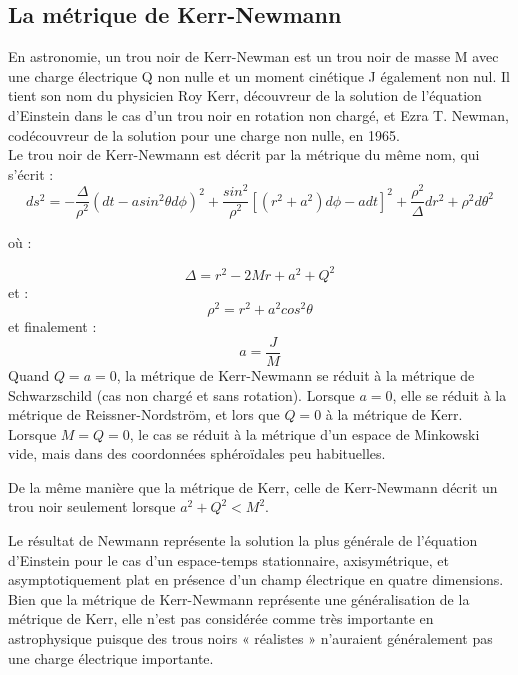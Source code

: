 \subsection{La métrique de Kerr-Newmann}
En astronomie, un trou noir de Kerr-Newman est un trou noir de masse M avec une charge électrique Q non nulle et un moment cinétique J également non nul. Il tient son nom du physicien Roy Kerr, découvreur de la solution de l'équation d'Einstein dans le cas d'un trou noir en rotation non chargé, et Ezra T. Newman, codécouvreur de la solution pour une charge non nulle, en 1965.\\
Le trou noir de Kerr-Newmann est décrit par la métrique du même nom, qui s'écrit :
\begin{equation}
ds^{2}=-\dfrac{\Delta}{\rho^{2}}(dt-asin^{2}\theta d\phi)^{2}+\dfrac{sin^{2}}{\rho^{2}}[(r^{2}+a^{2})d\phi-adt]^{2}+\dfrac{\rho^{2}}{\Delta}dr^{2}+\rho^{2}d\theta^{2}
\end{equation}

où :

$$\Delta=r^{2}-2Mr+a^{2}+Q^{2}$$
et :
$$\rho^{2}=r^{2}+a^{2}cos^{2}\theta$$ 
et finalement :
$$a=\dfrac{J}{M}$$
Quand $Q=a=0$, la métrique de Kerr-Newmann se réduit à la métrique de Schwarzschild (cas non chargé et sans rotation). Lorsque $a=0$, elle se réduit à la métrique de Reissner-Nordström, et lors que $ Q=0$ à la métrique de Kerr. Lorsque $ M=Q=0$, le cas se réduit à la métrique d'un espace de Minkowski vide, mais dans des coordonnées sphéroïdales peu habituelles.

De la même manière que la métrique de Kerr, celle de Kerr-Newmann décrit un trou noir seulement lorsque $a^{2}+Q^{2}< M^{2}$.	
	
Le résultat de Newmann représente la solution la plus générale de l'équation d'Einstein pour le cas d'un espace-temps stationnaire, axisymétrique, et asymptotiquement plat en présence d'un champ électrique en quatre dimensions. Bien que la métrique de Kerr-Newmann représente une généralisation de la métrique de Kerr, elle n'est pas considérée comme très importante en astrophysique puisque des trous noirs « réalistes » n'auraient généralement pas une charge électrique importante.

